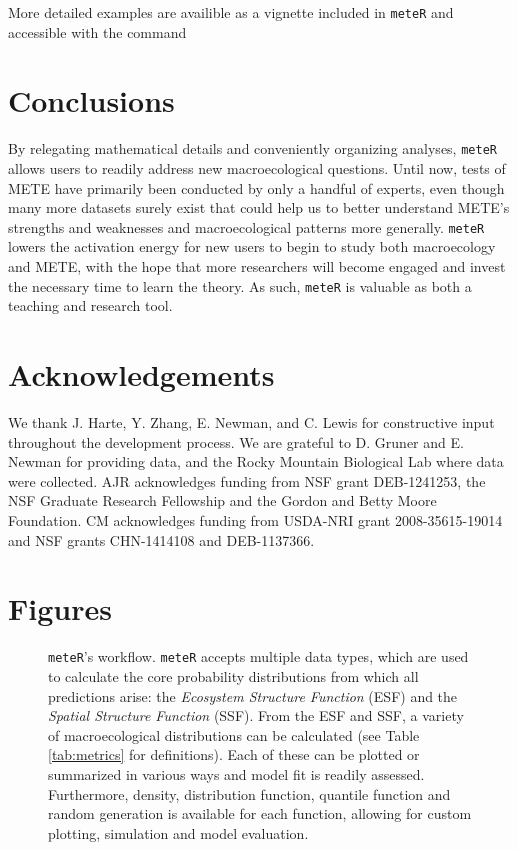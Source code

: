 More detailed examples are availible as a vignette included in
\texttt{meteR} and accessible with the command


\section{Conclusions}

By relegating mathematical details and conveniently organizing
analyses, \texttt{meteR} allows users to readily address new
macroecological questions. Until now, tests of METE have primarily
been conducted by only a handful of experts, even though many more
datasets surely exist that could help us to better understand METE's
strengths and weaknesses and macroecological patterns more generally.
\texttt{meteR} lowers the activation energy for new users to begin to
study both macroecology and METE, with the hope that more researchers
will become engaged and invest the necessary time to learn the theory.
As such, \texttt{meteR} is valuable as both a teaching and research tool.


\section*{Acknowledgements}
We thank J. Harte, Y. Zhang, E. Newman, and C. Lewis for constructive
input throughout the development process. We are grateful to D. Gruner
and E. Newman for providing data, and the Rocky Mountain Biological
Lab where data were collected. AJR acknowledges funding from NSF grant
DEB-1241253, the NSF Graduate Research Fellowship and the Gordon and
Betty Moore Foundation. CM acknowledges funding from USDA-NRI grant
2008-35615-19014 and NSF grants CHN-1414108 and DEB-1137366.


% 
% 

\clearpage



\section*{Figures}


\begin{figure}[H] 
\begin{center}
\caption[\texttt{meteR}'s workflow]{\texttt{meteR}'s workflow. \texttt{meteR} accepts multiple data
  types, which are used to calculate the core probability
  distributions from which all predictions arise: the \textit{Ecosystem
    Structure Function} (ESF) and the \textit{Spatial Structure Function}
  (SSF). From the ESF and SSF, a variety of macroecological
  distributions can be calculated (see Table \ref{tab:metrics} for
  definitions). Each of these can be plotted or summarized in various
  ways and model fit is readily assessed. Furthermore, density,
  distribution function, quantile function and random generation is
  available for each function, allowing for custom plotting,
  simulation and model evaluation.}
\label{fig:workflow}
\end{center} 
\end{figure}



